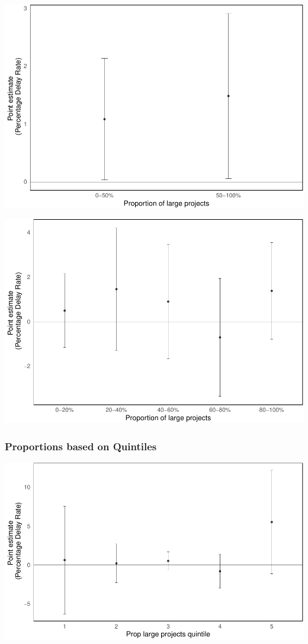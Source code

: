 \documentclass[
]{article}
\begin{document}
\includegraphics{qp_first_pc_delay-2_files/figure-latex/project_portfolio_discrete_halves-1.pdf}

\includegraphics{qp_first_pc_delay-2_files/figure-latex/project_portfolio_discrete_defined-1.pdf}

\hypertarget{proportions-based-on-quintiles}{%
\subsubsection{Proportions based on
Quintiles}\label{proportions-based-on-quintiles}}

\includegraphics{qp_first_pc_delay-2_files/figure-latex/project_portfolio_discrete-1.pdf}
\end{document}
